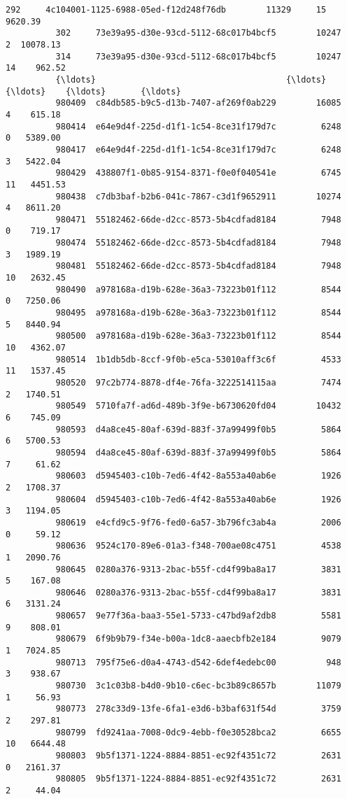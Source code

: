 \documentclass[11pt]{article}
\begin{document}
\begin{Verbatim}[commandchars=\\\{\}]
          292     4c104001-1125-6988-05ed-f12d248f76db        11329     15   9620.39   
          302     73e39a95-d30e-93cd-5112-68c017b4bcf5        10247      2  10078.13   
          314     73e39a95-d30e-93cd-5112-68c017b4bcf5        10247     14    962.52   
          {\ldots}                                      {\ldots}          {\ldots}    {\ldots}       {\ldots}   
          980409  c84db585-b9c5-d13b-7407-af269f0ab229        16085      4    615.18   
          980414  e64e9d4f-225d-d1f1-1c54-8ce31f179d7c         6248      0   5389.00   
          980417  e64e9d4f-225d-d1f1-1c54-8ce31f179d7c         6248      3   5422.04   
          980429  438807f1-0b85-9154-8371-f0e0f040541e         6745     11   4451.53   
          980438  c7db3baf-b2b6-041c-7867-c3d1f9652911        10274      4   8611.20   
          980471  55182462-66de-d2cc-8573-5b4cdfad8184         7948      0    719.17   
          980474  55182462-66de-d2cc-8573-5b4cdfad8184         7948      3   1989.19   
          980481  55182462-66de-d2cc-8573-5b4cdfad8184         7948     10   2632.45   
          980490  a978168a-d19b-628e-36a3-73223b01f112         8544      0   7250.06   
          980495  a978168a-d19b-628e-36a3-73223b01f112         8544      5   8440.94   
          980500  a978168a-d19b-628e-36a3-73223b01f112         8544     10   4362.07   
          980514  1b1db5db-8ccf-9f0b-e5ca-53010aff3c6f         4533     11   1537.45   
          980520  97c2b774-8878-df4e-76fa-3222514115aa         7474      2   1740.51   
          980549  5710fa7f-ad6d-489b-3f9e-b6730620fd04        10432      6    745.09   
          980593  d4a8ce45-80af-639d-883f-37a99499f0b5         5864      6   5700.53   
          980594  d4a8ce45-80af-639d-883f-37a99499f0b5         5864      7     61.62   
          980603  d5945403-c10b-7ed6-4f42-8a553a40ab6e         1926      2   1708.37   
          980604  d5945403-c10b-7ed6-4f42-8a553a40ab6e         1926      3   1194.05   
          980619  e4cfd9c5-9f76-fed0-6a57-3b796fc3ab4a         2006      0     59.12   
          980636  9524c170-89e6-01a3-f348-700ae08c4751         4538      1   2090.76   
          980645  0280a376-9313-2bac-b55f-cd4f99ba8a17         3831      5    167.08   
          980646  0280a376-9313-2bac-b55f-cd4f99ba8a17         3831      6   3131.24   
          980657  9e77f36a-baa3-55e1-5733-c47bd9af2db8         5581      9    808.01   
          980679  6f9b9b79-f34e-b00a-1dc8-aaecbfb2e184         9079      1   7024.85   
          980713  795f75e6-d0a4-4743-d542-6def4edebc00          948      3    938.67   
          980730  3c1c03b8-b4d0-9b10-c6ec-bc3b89c8657b        11079      1     56.93   
          980773  278c33d9-13fe-6fa1-e3d6-b3baf631f54d         3759      2    297.81   
          980799  fd9241aa-7008-0dc9-4ebb-f0e30528bca2         6655     10   6644.48   
          980803  9b5f1371-1224-8884-8851-ec92f4351c72         2631      0   2161.37   
          980805  9b5f1371-1224-8884-8851-ec92f4351c72         2631      2     44.04   
          

\end{Verbatim}
\end{document}
